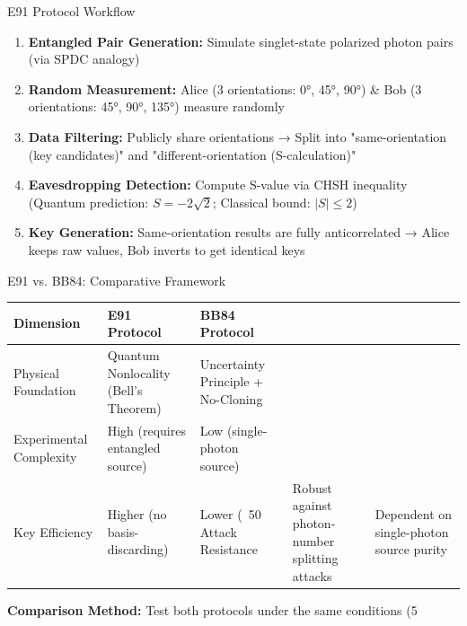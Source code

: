 \documentclass{beamer} %
\begin{document}
\begin{frame}{E91 Protocol Workflow}
    \vspace{1em}
    \begin{enumerate}[<+->, label=Step \arabic*:]
        \item \textbf{Entangled Pair Generation:} Simulate singlet-state polarized photon pairs (via SPDC analogy)
        \item \textbf{Random Measurement:} Alice (3 orientations: 0°, 45°, 90°) \& Bob (3 orientations: 45°, 90°, 135°) measure randomly
        \item \textbf{Data Filtering:} Publicly share orientations → Split into "same-orientation (key candidates)" and "different-orientation (S-calculation)"
        \item \textbf{Eavesdropping Detection:} Compute S-value via CHSH inequality (Quantum prediction: $S=-2\sqrt{2}$; Classical bound: $|S| \leq 2$)
        \item \textbf{Key Generation:} Same-orientation results are fully anticorrelated → Alice keeps raw values, Bob inverts to get identical keys
    \end{enumerate}
\end{frame}


\begin{frame}{E91 vs. BB84: Comparative Framework}
    \centering
    \begin{tabular}{|l|l|l|}
        \hline
        \textbf{Dimension} & \textbf{E91 Protocol} & \textbf{BB84 Protocol} \\
        \hline
        Physical Foundation & Quantum Nonlocality (Bell's Theorem) & Uncertainty Principle + No-Cloning \\
        \hline
        Experimental Complexity & High (requires entangled source) & Low (single-photon source) \\
        \hline
        Key Efficiency & Higher (no basis-discarding) & Lower (~50%
        \hline
        Attack Resistance & Robust against photon-number splitting attacks & Dependent on single-photon source purity \\
        \hline
    \end{tabular}
    \vspace{1em}
    \textbf{Comparison Method:} Test both protocols under the same conditions (5%
\end{frame}
\end{document}
